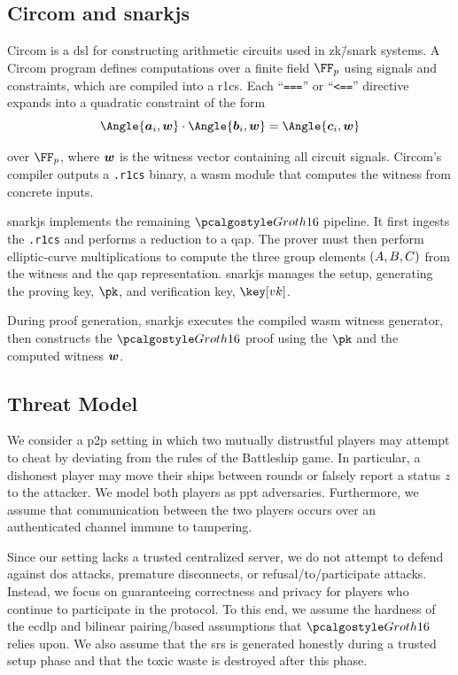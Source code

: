 \subsection{Circom and snarkjs}
\label{subsec:circomsnarkjs}

Circom \cite{circomlib} is a \gls{dsl} for constructing arithmetic circuits used in \gls{zk}\=/\gls{snark} systems. A Circom program defines computations over a finite field $\FF_p$ using signals and constraints, which are compiled into a \gls{r1cs}. Each \enquote{\texttt{===}} or \enquote{\texttt{<==}} directive expands into a quadratic constraint of the form
\begin{equation*}
    \Angle{\vect{a}_i, \vect{w}} \cdot \Angle{\vect{b}_i, \vect{w}} = \Angle{\vect{c}_i, \vect{w}}
\end{equation*}

\noindent over $\FF_p$, where $\bm{w}$ is the witness vector containing all circuit signals. Circom's compiler outputs a \texttt{.r1cs} binary, a \gls{wasm} module that computes the witness from concrete inputs.

snarkjs \cite{snarkjs} implements the remaining $\groth$ pipeline. It first ingests the \texttt{.r1cs} and performs a reduction to a \gls{qap}. The prover must then perform elliptic‑curve multiplications to compute the three group elements $\left(A, B, C\right)$ from the witness and the \gls{qap} representation. snarkjs manages the setup, generating the proving key, $\pk$, and verification key, $\vkey$.

During proof generation, snarkjs executes the compiled \gls{wasm} witness generator, then constructs the $\groth$ proof using the $\pk$ and the computed witness $\bm{w}$.

\subsection{Threat Model}
\label{subsec:threatModel}

We consider a \gls{p2p} setting in which two mutually distrustful players may attempt to cheat by deviating from the rules of the Battleship game. In particular, a dishonest player may move their ships between rounds or falsely report a status $z$ to the attacker. We model both players as \gls{ppt} adversaries. Furthermore, we assume that communication between the two players occurs over an authenticated channel immune to tampering.

Since our setting lacks a trusted centralized server, we do not attempt to defend against \gls{dos} attacks, premature disconnects, or refusal\-/to\-/participate attacks. Instead, we focus on guaranteeing correctness and privacy for players who continue to participate in the protocol. To this end, we assume the hardness of the \gls{ecdlp} and bilinear pairing\-/based assumptions that $\groth$ relies upon. We also assume that the \gls{srs} is generated honestly during a trusted setup phase and that the toxic waste is destroyed after this phase.

